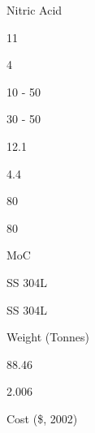 \documentclass[a4paper,portrait,12pt]{article}
\begin{document}
\begin{flushleft}
Nitric Acid
\end{flushleft}





11





4





10 - 50





30 - 50





12.1





4.4





80





80





\begin{flushleft}
MoC
\end{flushleft}





\begin{flushleft}
SS 304L
\end{flushleft}





\begin{flushleft}
SS 304L
\end{flushleft}





\begin{flushleft}
Weight (Tonnes)
\end{flushleft}





88.46





2.006





\begin{flushleft}
Cost (\$, 2002)
\end{flushleft}
\end{document}
